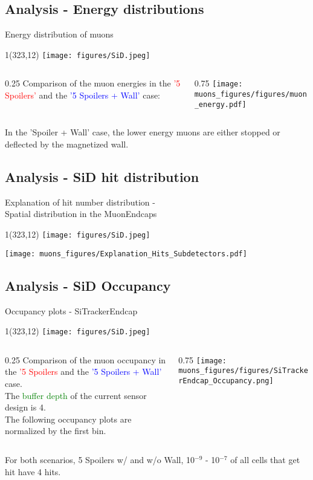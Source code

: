 \documentclass[xcolor={dvipsnames}]{beamer}
\newcommand{\sidlogo}{
  \setlength{\TPHorizModule}{1pt}
  \setlength{\TPVertModule}{1pt}
  \begin{textblock}{1}(323,12)
   \texttt{[image: figures/SiD.jpeg]}
  \end{textblock}
  }
\begin{document}
\subsection{Analysis - Energy distributions}
\begin{frame}{Energy distribution of muons}
\sidlogo
\begin{columns}
 \begin{column}{0.25\textwidth}
 \small
  Comparison of the muon energies in the \textcolor{red}{'5 Spoilers'} and the \textcolor{blue}{'5 Spoilers + Wall'} case:
 \end{column}
 \begin{column}{0.75\textwidth}
  \texttt{[image: muons\_figures/figures/muon\_energy.pdf]}
 \end{column}
\end{columns}
In the 'Spoiler + Wall' case, the lower energy muons are either stopped or deflected by the magnetized wall.
\end{frame}

\subsection{Analysis - SiD hit distribution}
\begin{frame}{Explanation of hit number distribution -\\ \small Spatial distribution in the MuonEndcaps}
\sidlogo
 \begin{center}
\texttt{[image: muons\_figures/Explanation\_Hits\_Subdetectors.pdf]}
\end{center}
\end{frame}

\subsection{Analysis - SiD Occupancy}
\begin{frame}{Occupancy plots - \small SiTrackerEndcap}
\sidlogo
\begin{columns}
 \begin{column}{0.25\textwidth}
 \small
  Comparison of the muon occupancy in the \textcolor{red}{'5 Spoilers} and the \textcolor{blue}{'5 Spoilers + Wall'} case.\\{\small The \textcolor{green}{buffer depth} of the current sensor design is 4.}\\
  \vspace*{0.2cm}
  {\footnotesize The following occupancy plots are normalized by the first bin.}
 \end{column}
 \begin{column}{0.75\textwidth}
\texttt{[image: muons\_figures/figures/SiTrackerEndcap\_Occupancy.png]}
\end{column}
\end{columns}
For both scenarios, 5 Spoilers w/ and w/o Wall, 10$^{-9}$ - 10$^{-7}$ of all cells that get hit have 4 hits.
\end{frame}
\end{document}
